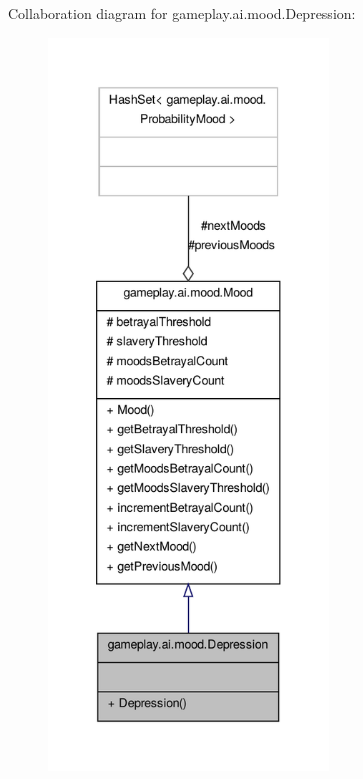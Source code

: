 Collaboration diagram for gameplay.\-ai.\-mood.\-Depression\-:\nopagebreak
\begin{figure}[H]
\begin{center}
\leavevmode
\includegraphics[height=550pt]{classgameplay_1_1ai_1_1mood_1_1_depression__coll__graph}
\end{center}
\end{figure}
